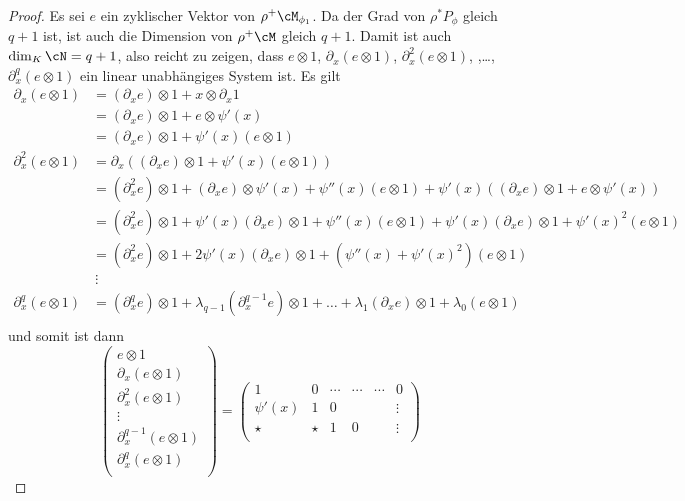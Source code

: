 \begin{proof}
Es sei $e$ ein zyklischer Vektor von $\rho^+\cM_{\phi_1}$.
Da der Grad von $\rho^*P_{\phi}$ gleich $q+1$ ist, ist auch die Dimension von
$\rho^+\cM$ gleich $q+1$. Damit ist auch $\dim_K\cN=q+1$, also reicht zu
zeigen, dass $e\otimes 1$, $\partial_x(e\otimes 1)$, $\partial_x^2(e\otimes
1)$, ,\dots, $\partial_x^{q}(e\otimes 1)$ ein linear unabhängiges System ist.
Es gilt
\begin{align*}
\partial_x(e\otimes 1) &= (\partial_x e)\otimes 1 + x\otimes \partial_x 1\\
  &= (\partial_x e)\otimes 1 + e\otimes \psi'(x)\\
  &= (\partial_x e)\otimes 1 +  \psi'(x)(e\otimes 1)\\
\partial_x^2(e\otimes 1) &= \partial_x((\partial_x e)\otimes 1 +
    \psi'(x)(e\otimes 1))\\
  &= (\partial_x^2 e)\otimes 1 + (\partial_x e)\otimes \psi'(x)
  + \psi''(x)(e\otimes 1)
  + \psi'(x)((\partial_x e)\otimes 1 + e\otimes \psi'(x))\\
  &= (\partial_x^2 e)\otimes 1
  + \psi'(x)(\partial_x e)\otimes 1
  + \psi''(x)(e\otimes 1)
  + \psi'(x)(\partial_x e)\otimes 1
  + \psi'(x)^2(e\otimes 1)\\
  &= (\partial_x^2 e)\otimes 1
  + 2\psi'(x)(\partial_x e)\otimes 1
  + (\psi''(x) + \psi'(x)^2)(e\otimes 1)\\
  &~\vdots\\
\partial_x^{q}(e\otimes 1) &= (\partial_x^q e)\otimes 1
  + \lambda_{q-1}(\partial_x^{q-1} e)\otimes 1
  +\dots
  + \lambda_{1}(\partial_x e)\otimes 1
  + \lambda_0(e\otimes 1)\\
\end{align*}
und somit ist dann
\[
\begin{pmatrix}
e\otimes 1\\
\partial_x(e\otimes 1)\\
\partial_x^2(e\otimes 1)\\
\vdots\\
\partial_x^{q-1}(e\otimes 1)\\
\partial_x^{q}(e\otimes 1)\\
\end{pmatrix}
=
\begin{pmatrix}
1         & 0         & \cdots & \cdots & \cdots        & 0 \\
\psi'(x)  & 1         & 0      &        &               & \vdots\\
\star     & \star     & 1      & 0      &               & \vdots\\

\end{pmatrix}\]
\end{proof}
